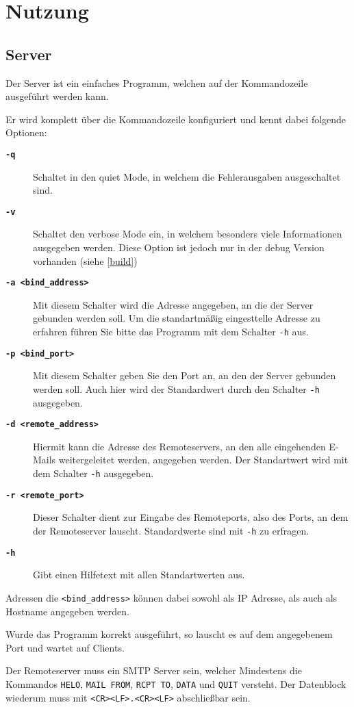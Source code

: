 \documentclass[pdftex,final,a4paper,10pt,notitlepage,halfparskip]{scrreprt}
\begin{document}
\chapter{Nutzung}
\section{Server}
Der Server ist ein einfaches Programm, welchen auf der Kommandozeile ausgeführt werden kann.

Er wird komplett über die Kommandozeile konfiguriert und kennt dabei folgende Optionen:
\begin{description}
  \item[\texttt\bfseries{-q}] Schaltet in den quiet Mode, in welchem die Fehlerausgaben ausgeschaltet sind.
  \item[\texttt\bfseries{-v}] Schaltet den verbose Mode ein, in welchem besonders viele Informationen ausgegeben werden. Diese Option ist jedoch nur in der debug Version vorhanden (siehe \ref{build})
  \item[\texttt\bfseries{-a <bind\_address>}] Mit diesem Schalter wird die Adresse angegeben, an die der Server gebunden werden soll. Um die standartmäßig eingesttelle Adresse zu erfahren führen Sie bitte das Programm mit dem Schalter \texttt{-h} aus. 
  \item[\texttt\bfseries{-p <bind\_port>}] Mit diesem Schalter geben Sie den Port an, an den der Server gebunden werden soll. Auch hier wird der Standardwert durch den Schalter \texttt{-h} ausgegeben.
  \item[\texttt\bfseries{-d <remote\_address>}] Hiermit kann die Adresse des Remoteservers, an den alle eingehenden E-Mails weitergeleitet werden, angegeben werden. Der Standartwert wird mit dem Schalter \texttt{-h} ausgegeben.
  \item[\texttt\bfseries{-r <remote\_port>}] Dieser Schalter dient zur Eingabe des Remoteports, also des Ports, an dem der Remoteserver lauscht. Standardwerte sind mit \texttt{-h} zu erfragen.
  \item[\texttt\bfseries{-h}] Gibt einen Hilfetext mit allen Standartwerten aus. 
\end{description}
Adressen die \texttt{<bind\_address>} können dabei sowohl als IP Adresse, als auch als Hostname angegeben werden.

Wurde das Programm korrekt ausgeführt, so lauscht es auf dem angegebenem Port und wartet auf Clients.

Der Remoteserver muss ein SMTP Server sein, welcher Mindestens die Kommandos \texttt{HELO}, \texttt{MAIL FROM}, \texttt{RCPT TO}, \texttt{DATA} und \texttt{QUIT} versteht. Der Datenblock wiederum muss mit \texttt{<CR><LF>.<CR><LF>} abschließbar sein.
\end{document}
